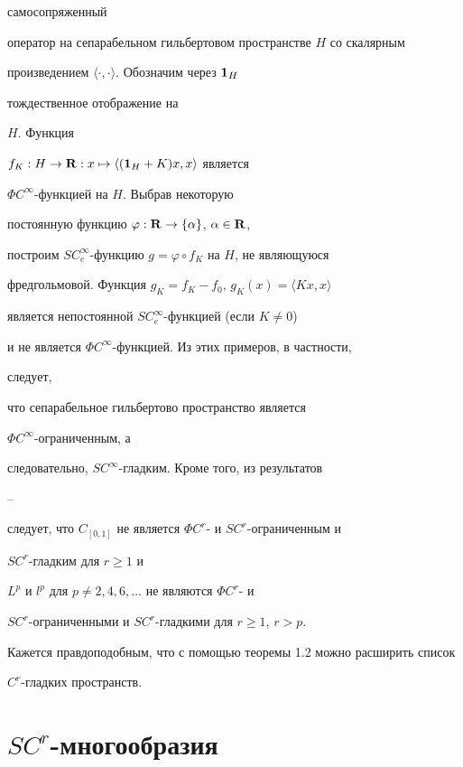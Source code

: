 самосопряженный


оператор на сепарабельном гильбертовом пространстве $H$ со скалярным


произведением $\langle\cdot,\cdot\rangle$. Обозначим через $\bold 1_H$


тождественное отображение на


$H$. Функция


$f_K:H\to\bold R:x\mapsto\langle(\bold 1_H+K)x,x\rangle$ является


$\Phi C^\infty$-функцией на $H$. Выбрав некоторую


постоянную функцию $\varphi:\bold R\to\{\alpha\}$, $\alpha\in\bold R$,


построим $SC^\infty_e$-функцию $g=\varphi\circ f_K$ на $H$, не являющуюся


фредгольмовой. Функция $g_K=f_K-f_0$, $g_K(x)=\langle Kx,x\rangle$


является непостоянной $SC^\infty_e$-функцией (если $K\ne 0$)


и не является $\Phi C^\infty$-функцией. Из этих примеров, в частности,


следует,


что сепарабельное гильбертово пространство является


$\Phi C^\infty$-ограниченным, а


следовательно, $SC^\infty$-гладким. Кроме того, из результатов


\cite{1}--\cite{3}


следует, что $C_{[0,1]}$ не является $\Phi C^r$- и $SC^r$-ограниченным и


$SC^r$-гладким для $r\ge 1$ и


$L^p$ и $l^p$ для $p\ne2,4,6,\dotsc$ не являются $\Phi C^r$- и


$SC^r$-ограниченными и $SC^r$-гладкими для $r\ge 1$, $r>p$.





Кажется правдоподобным, что с помощью теоремы 1.2 можно расширить список


$C^r$-гладких пространств.





\section{$SC^r$-многообразия}





